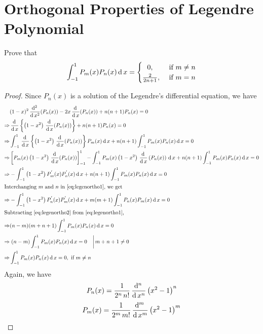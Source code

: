\documentclass[../main-sheet.tex]{subfiles}
\begin{document}
\section{Orthogonal Properties of Legendre Polynomial}
\begin{prob}
    Prove that 
    \[
        \int_{-1}^1 P_m(x)P_n(x)\,\mathrm{d}\, x=
        \begin{cases}
            \,\,\,\,0,&\text{ if }m\neq n\\
            \frac{2}{2n+1},&\text{ if }m= n\\
        \end{cases}
    \]
\end{prob}
\begin{proof}
    Since $ P_n(x) $ is a solution of the Legendre's differential equation, we have
    \begin{align}
        &(1-x)^2\,\frac{\mathrm{d}^{2}\, }{\mathrm{d}\, x^{2}}(P_n(x))-2x\,\frac{\mathrm{d}\,}{\mathrm{d}\,x}(P_n(x))+n(n+1)P_n(x)=0\notag\\
        \Rightarrow & \,\frac{\mathrm{d}\,}{\mathrm{d}\,x}\left\{ \left(1-x^2\right)\,\frac{\mathrm{d}\,}{\mathrm{d}\,x}(P_n(x))\right\}+n(n+1)P_n(x)=0\notag\\
        \Rightarrow & \int_{-1}^1 \,\frac{\mathrm{d}\,}{\mathrm{d}\,x}\left\{ \left(1-x^2\right)\,\frac{\mathrm{d}\,}{\mathrm{d}\,x}(P_n(x))\right\}P_m(x)\,\mathrm{d}\, x+n(n+1)\int_{-1}^1 P_m(x) P_n(x)\,\mathrm{d}\, x=0\notag\\
        \Rightarrow & \left[ P_m(x)\left(1-x^2\right)\,\frac{\mathrm{d}\,}{\mathrm{d}\,x}(P_n(x)) \right]_{-1}^1-\int_{-1}^1 P_m(x)\left(1-x^2\right)\,\frac{\mathrm{d}\,}{\mathrm{d}\,x}\left( P_n(x) \right)\,\mathrm{d}\, x+ n(n+1)\int_{-1}^1 P_m(x) P_n(x)\,\mathrm{d}\, x=0\notag\\
        \Rightarrow & -\int_{-1}^1 \left(1-x^2\right) P_m^{'}(x) P_n^{'}(x)\,\mathrm{d}\, x+n(n+1)\int_{-1}^1 P_m(x) P_n(x)\,\mathrm{d}\, x=0\label{eq:legenortho1}\\
        \intertext{Interchanging $ m $ and $ n $ in \eqref{eq:legenortho1}, we get}
        \Rightarrow & -\int_{-1}^1 \left(1-x^2\right) P_n^{'}(x) P_m^{'}(x)\,\mathrm{d}\, x+m(m+1)\int_{-1}^1 P_n(x) P_m(x)\,\mathrm{d}\, x=0\label{eq:legenortho2}\\
        \intertext{Subtracting \eqref{eq:legenortho2} from \eqref{eq:legenortho1},}
        \Rightarrow & (n-m)(m+n+1)\int_{-1}^1 P_m(x)P_n(x)\,\mathrm{d}\, x=0\notag\\
        \Rightarrow & \left.(n-m)\int_{-1}^1 P_m(x)P_n(x)\,\mathrm{d}\, x=0\quad\right\vert m+n+1\neq 0\notag\\
        \Rightarrow & \int_{-1}^1 P_m(x)P_n(x)\,\mathrm{d}\, x=0,\text{ if } m\neq n\notag
    \end{align}
    \newpage
    Again, we have
    \[
        P_n(x)=\frac{1}{2^n\, n!}\,\frac{\mathrm{d}^{n}\, }{\mathrm{d}\, x^{n}}\left(x^2-1\right)^n
    \]
    \[
        P_m(x)=\frac{1}{2^m\, m!}\,\frac{\mathrm{d}^{m}\, }{\mathrm{d}\, x^{m}}\left(x^2-1\right)^m
\]
\end{proof}
\end{document}
